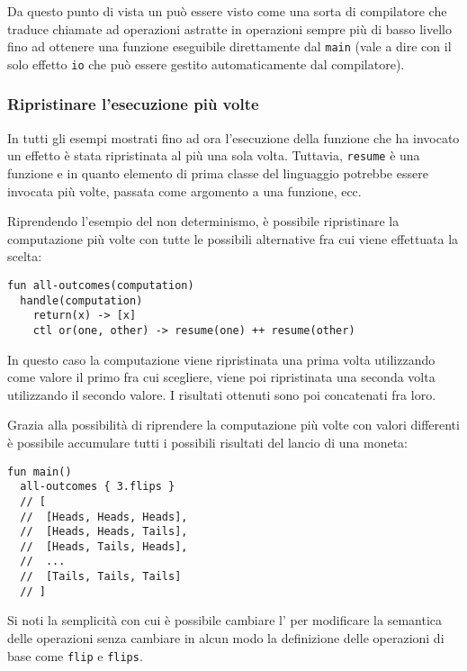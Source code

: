 Da questo punto di vista un  può essere visto come una sorta di compilatore che traduce chiamate ad operazioni astratte in operazioni sempre più di basso livello fino ad ottenere una funzione eseguibile direttamente dal \lstinline{main} (vale a dire con il solo effetto \lstinline{io} che può essere gestito automaticamente dal compilatore).

\subsubsection{Ripristinare l'esecuzione più volte}
In tutti gli esempi mostrati fino ad ora l'esecuzione della funzione che ha invocato un effetto è stata ripristinata al più una sola volta.
Tuttavia, \lstinline{resume} è una funzione e in quanto elemento di prima classe del linguaggio potrebbe essere invocata più volte, passata come argomento a una funzione, ecc.

Riprendendo l'esempio del non determinismo, è possibile ripristinare la computazione più volte con tutte le possibili alternative fra cui viene effettuata la scelta:
\begin{lstlisting}[language=koka]
fun all-outcomes(computation)
  handle(computation)
    return(x) -> [x]
    ctl or(one, other) -> resume(one) ++ resume(other)
\end{lstlisting}
In questo caso la computazione viene ripristinata una prima volta utilizzando come valore il primo fra cui scegliere, viene poi ripristinata una seconda volta utilizzando il secondo valore. I risultati ottenuti sono poi concatenati fra loro.

Grazia alla possibilità di riprendere la computazione più volte con valori differenti è possibile accumulare tutti i possibili risultati del lancio di una moneta:
\begin{lstlisting}[language=koka]
fun main()
  all-outcomes { 3.flips }
  // [
  //  [Heads, Heads, Heads],
  //  [Heads, Heads, Tails],
  //  [Heads, Tails, Heads],
  //  ...
  //  [Tails, Tails, Tails]
  // ]
\end{lstlisting}

Si noti la semplicità con cui è possibile cambiare l' per modificare la semantica delle operazioni senza cambiare in alcun modo la definizione delle operazioni di base come \lstinline{flip} e \lstinline{flips}.
